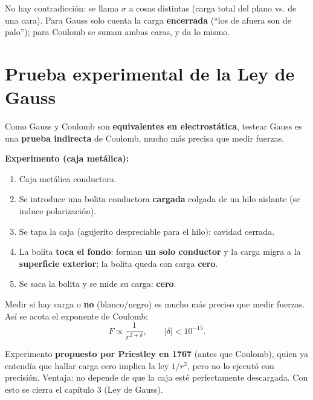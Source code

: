 \documentclass[12pt,a4paper]{article}
\begin{document}
\begin{keybox}
  No hay contradicción: se llama $\sigma$ a cosas distintas (carga total
  del plano vs. de una cara). Para Gauss solo cuenta la carga
  \textbf{encerrada} (\enquote{los de afuera son de palo}); para Coulomb
  se suman ambas caras, y da lo mismo.
\end{keybox}

\section{Prueba experimental de la Ley de Gauss}

Como Gauss y Coulomb son \textbf{equivalentes en electrostática},
testear Gauss es una \textbf{prueba indirecta} de Coulomb, mucho más
precisa que medir fuerzas.

\textbf{Experimento (caja metálica):}
\begin{enumerate}[nosep]
  \item Caja metálica conductora.
  \item Se introduce una bolita conductora \textbf{cargada} colgada de
        un hilo aislante (se induce polarización).
  \item Se tapa la caja (agujerito despreciable para el hilo): cavidad
        cerrada.
  \item La bolita \textbf{toca el fondo}: forman \textbf{un solo
        conductor} y la carga migra a la \textbf{superficie exterior};
        la bolita queda con carga \textbf{cero}.
  \item Se saca la bolita y se mide su carga: \textbf{cero}.
\end{enumerate}

\begin{keybox}
  Medir si hay carga o \textbf{no} (blanco/negro) es mucho más preciso
  que medir fuerzas. Así se acota el exponente de Coulomb:
  \[
  F \propto \frac{1}{r^{2+\delta}}, \qquad |\delta| < 10^{-15}.
  \]
\end{keybox}

\begin{notebox}[Historia]
  Experimento \textbf{propuesto por Priestley en 1767} (antes que
  Coulomb), quien ya entendía que hallar carga cero implica la ley
  $1/r^{2}$, pero no lo ejecutó con precisión. Ventaja: no depende de
  que la caja esté perfectamente descargada. Con esto se cierra el
  capítulo 3 (Ley de Gauss).
\end{notebox}
\end{document}
